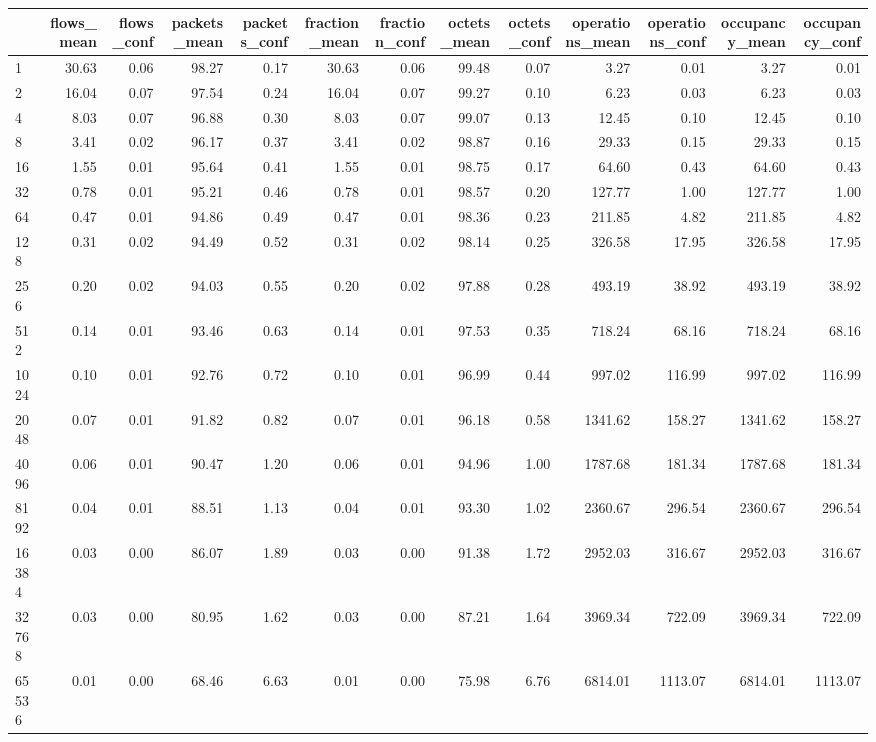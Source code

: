 \begin{tabular}{lrrrrrrrrrrrr}
\toprule
 & flows_mean & flows_conf & packets_mean & packets_conf & fraction_mean & fraction_conf & octets_mean & octets_conf & operations_mean & operations_conf & occupancy_mean & occupancy_conf \\
\midrule
1 & 30.63 & 0.06 & 98.27 & 0.17 & 30.63 & 0.06 & 99.48 & 0.07 & 3.27 & 0.01 & 3.27 & 0.01 \\
2 & 16.04 & 0.07 & 97.54 & 0.24 & 16.04 & 0.07 & 99.27 & 0.10 & 6.23 & 0.03 & 6.23 & 0.03 \\
4 & 8.03 & 0.07 & 96.88 & 0.30 & 8.03 & 0.07 & 99.07 & 0.13 & 12.45 & 0.10 & 12.45 & 0.10 \\
8 & 3.41 & 0.02 & 96.17 & 0.37 & 3.41 & 0.02 & 98.87 & 0.16 & 29.33 & 0.15 & 29.33 & 0.15 \\
16 & 1.55 & 0.01 & 95.64 & 0.41 & 1.55 & 0.01 & 98.75 & 0.17 & 64.60 & 0.43 & 64.60 & 0.43 \\
32 & 0.78 & 0.01 & 95.21 & 0.46 & 0.78 & 0.01 & 98.57 & 0.20 & 127.77 & 1.00 & 127.77 & 1.00 \\
64 & 0.47 & 0.01 & 94.86 & 0.49 & 0.47 & 0.01 & 98.36 & 0.23 & 211.85 & 4.82 & 211.85 & 4.82 \\
128 & 0.31 & 0.02 & 94.49 & 0.52 & 0.31 & 0.02 & 98.14 & 0.25 & 326.58 & 17.95 & 326.58 & 17.95 \\
256 & 0.20 & 0.02 & 94.03 & 0.55 & 0.20 & 0.02 & 97.88 & 0.28 & 493.19 & 38.92 & 493.19 & 38.92 \\
512 & 0.14 & 0.01 & 93.46 & 0.63 & 0.14 & 0.01 & 97.53 & 0.35 & 718.24 & 68.16 & 718.24 & 68.16 \\
1024 & 0.10 & 0.01 & 92.76 & 0.72 & 0.10 & 0.01 & 96.99 & 0.44 & 997.02 & 116.99 & 997.02 & 116.99 \\
2048 & 0.07 & 0.01 & 91.82 & 0.82 & 0.07 & 0.01 & 96.18 & 0.58 & 1341.62 & 158.27 & 1341.62 & 158.27 \\
4096 & 0.06 & 0.01 & 90.47 & 1.20 & 0.06 & 0.01 & 94.96 & 1.00 & 1787.68 & 181.34 & 1787.68 & 181.34 \\
8192 & 0.04 & 0.01 & 88.51 & 1.13 & 0.04 & 0.01 & 93.30 & 1.02 & 2360.67 & 296.54 & 2360.67 & 296.54 \\
16384 & 0.03 & 0.00 & 86.07 & 1.89 & 0.03 & 0.00 & 91.38 & 1.72 & 2952.03 & 316.67 & 2952.03 & 316.67 \\
32768 & 0.03 & 0.00 & 80.95 & 1.62 & 0.03 & 0.00 & 87.21 & 1.64 & 3969.34 & 722.09 & 3969.34 & 722.09 \\
65536 & 0.01 & 0.00 & 68.46 & 6.63 & 0.01 & 0.00 & 75.98 & 6.76 & 6814.01 & 1113.07 & 6814.01 & 1113.07 \\

\end{tabular}
